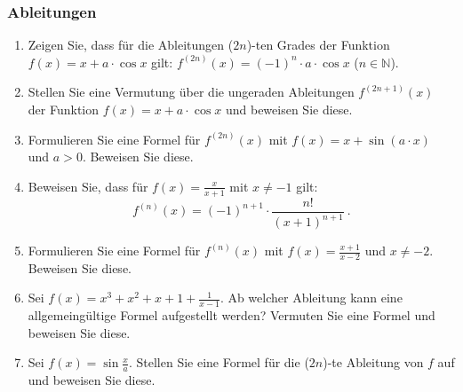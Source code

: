 \subsubsection{Ableitungen}
\begin{enumerate}
	\item Zeigen Sie, dass für die Ableitungen ($2n$)-ten Grades der Funktion $ f(x) = x + a \cdot \cos x $ gilt: $ f^{(2n)}(x) = (-1)^n \cdot a \cdot \cos x $ ($ n \in \mathbb{N}$).
	\item Stellen Sie eine Vermutung über die ungeraden Ableitungen $ f^{(2n+1)}(x) $ der Funktion $ f(x) = x + a \cdot \cos x $ und beweisen Sie diese.
	\item Formulieren Sie eine Formel für  $f^{(2n)}(x)$ mit $f(x) = x + \sin (a \cdot x) $ und $ a > 0 $. Beweisen Sie diese.
	\item Beweisen Sie, dass für $f(x) = \frac{x}{x+1} $ mit $ x \neq -1 $ gilt: \[f^{(n)}(x) = (-1)^{n+1} \cdot \frac{n!}{(x+1)^{n+1}}\ .\]
	\item Formulieren Sie eine Formel für  $f^{(n)}(x)$ mit $f(x) = \frac{x+1}{x-2} $ und $ x \neq -2 $. Beweisen Sie diese.
	\item Sei $f(x) = x^3 + x^2 + x + 1 + \frac{1}{x-1} $. Ab welcher Ableitung kann eine allgemeingültige Formel aufgestellt werden? Vermuten Sie eine Formel und beweisen Sie diese.
	\item Sei $f(x) = \sin \frac{x}{a}$. Stellen Sie eine Formel für die ($2n$)-te Ableitung von $f$ auf und beweisen Sie diese.
\end{enumerate}